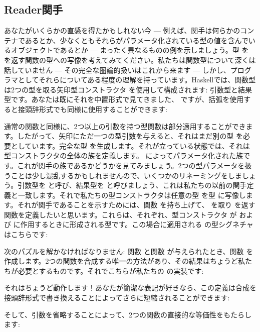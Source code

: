 \subsection{Reader関手}

あなたがいくらかの直感を得たかもしれない今 — 例えば、関手は何らかのコンテナであるとか、少なくともそれらがパラメータ化されている型の値を含んでいるオブジェクトであるとか — まったく異なるものの例を示しましょう。型  を  を返す関数の型への写像を考えてみてください。私たちは関数型について深くは話していません — その完全な圏論的扱いはこれから来ます — しかし、プログラマとしてそれらについてある程度の理解を持っています。Haskellでは、関数型は2つの型を取る矢印型コンストラクタ \code{(->)} を使用して構成されます: 引数型と結果型です。あなたは既にそれを中置形式で見てきました、 ですが、括弧を使用すると接頭辞形式でも同様に使用することができます: 

通常の関数と同様に、2つ以上の引数を持つ型関数は部分適用することができます。したがって、矢印にただ一つの型引数を与えると、それはまだ別の型  を必要としています。完全な型  を生成します。それが立っている状態では、それは型コンストラクタの全体の族を定義します。 によってパラメータ化された族です。これが関手の族であるかどうかを見てみましょう。2つの型パラメータを扱うことは少し混乱するかもしれませんので、いくつかのリネーミングをしましょう。引数型を  と呼び、結果型を  と呼びましょう、これは私たちの以前の関手定義と一致します。それで私たちの型コンストラクタは任意の型  を型  に写像します。それが関手であることを示すためには、関数  を持ち上げて、 を取り  を返す関数を定義したいと思います。これらは、それぞれ、型コンストラクタ  が  および  に作用するときに形成される型です。この場合に適用される  の型シグネチャはこちらです: 

次のパズルを解かなければなりません: 関数  と関数  が与えられたとき、関数  を作成します。2つの関数を合成する唯一の方法があり、その結果はちょうど私たちが必要とするものです。それでこちらが私たちの  の実装です: 

それはちょうど動作します！あなたが簡潔な表記が好きなら、この定義は合成を接頭辞形式で書き換えることによってさらに短縮されることができます: 

そして、引数を省略することによって、2つの関数の直接的な等価性をもたらします: 

